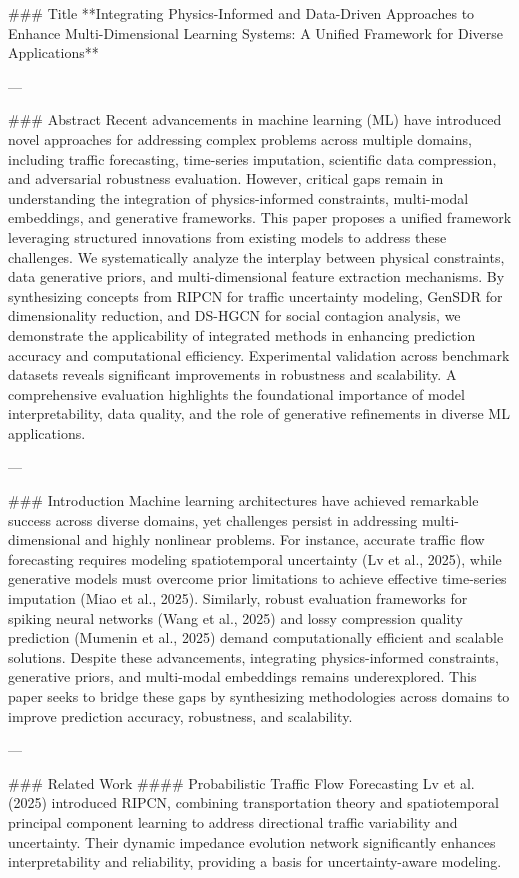 ### Title  
**Integrating Physics-Informed and Data-Driven Approaches to Enhance Multi-Dimensional Learning Systems: A Unified Framework for Diverse Applications**

---

### Abstract  
Recent advancements in machine learning (ML) have introduced novel approaches for addressing complex problems across multiple domains, including traffic forecasting, time-series imputation, scientific data compression, and adversarial robustness evaluation. However, critical gaps remain in understanding the integration of physics-informed constraints, multi-modal embeddings, and generative frameworks. This paper proposes a unified framework leveraging structured innovations from existing models to address these challenges. We systematically analyze the interplay between physical constraints, data generative priors, and multi-dimensional feature extraction mechanisms. By synthesizing concepts from RIPCN for traffic uncertainty modeling, GenSDR for dimensionality reduction, and DS-HGCN for social contagion analysis, we demonstrate the applicability of integrated methods in enhancing prediction accuracy and computational efficiency. Experimental validation across benchmark datasets reveals significant improvements in robustness and scalability. A comprehensive evaluation highlights the foundational importance of model interpretability, data quality, and the role of generative refinements in diverse ML applications.

---

### Introduction  
Machine learning architectures have achieved remarkable success across diverse domains, yet challenges persist in addressing multi-dimensional and highly nonlinear problems. For instance, accurate traffic flow forecasting requires modeling spatiotemporal uncertainty (Lv et al., 2025), while generative models must overcome prior limitations to achieve effective time-series imputation (Miao et al., 2025). Similarly, robust evaluation frameworks for spiking neural networks (Wang et al., 2025) and lossy compression quality prediction (Mumenin et al., 2025) demand computationally efficient and scalable solutions. Despite these advancements, integrating physics-informed constraints, generative priors, and multi-modal embeddings remains underexplored. This paper seeks to bridge these gaps by synthesizing methodologies across domains to improve prediction accuracy, robustness, and scalability.

---

### Related Work  
#### Probabilistic Traffic Flow Forecasting  
Lv et al. (2025) introduced RIPCN, combining transportation theory and spatiotemporal principal component learning to address directional traffic variability and uncertainty. Their dynamic impedance evolution network significantly enhances interpretability and reliability, providing a basis for uncertainty-aware modeling.

